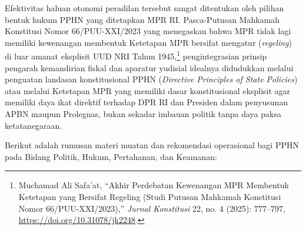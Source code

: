 \documentclass[12pt,a4paper,twocolumn]{article}
\begin{document}
Efektivitas haluan otonomi peradilan tersebut sangat ditentukan oleh pilihan bentuk hukum PPHN yang ditetapkan MPR RI. Pasca-Putusan Mahkamah Konstitusi Nomor 66/PUU-XXI/2023 yang menegaskan bahwa MPR tidak lagi memiliki kewenangan membentuk Ketetapan MPR bersifat mengatur (\textit{regeling}) di luar amanat eksplisit UUD NRI Tahun 1945,\footnote{Muchamad Ali Safa'at, ``Akhir Perdebatan Kewenangan MPR Membentuk Ketetapan yang Bersifat Regeling (Studi Putusan Mahkamah Konstitusi Nomor 66/PUU-XXI/2023),'' \textit{Jurnal Konstitusi} 22, no. 4 (2025): 777--797, \url{https://doi.org/10.31078/jk2248}.} pengintegrasian prinsip pengarah kemandirian fiskal dan aparatur yudisial idealnya didudukkan melalui penguatan landasan konstitusional PPHN (\textit{Directive Principles of State Policies}) atau melalui Ketetapan MPR yang memiliki dasar konstitusional eksplisit agar memiliki daya ikat direktif terhadap DPR RI dan Presiden dalam penyusunan APBN maupun Prolegnas, bukan sekadar imbauan politik tanpa daya paksa ketatanegaraan.

Berikut adalah rumusan materi muatan dan rekomendasi operasional bagi PPHN pada Bidang Politik, Hukum, Pertahanan, dan Keamanan:
\end{document}
